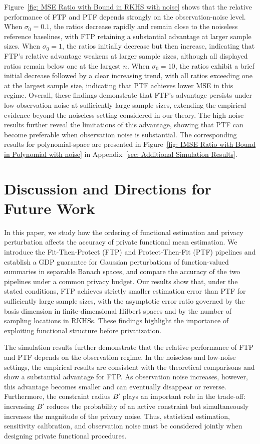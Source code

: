 \documentclass[twoside,11pt]{article}
\begin{document}
Figure~\ref{fig: MSE Ratio with Bound in RKHS with noise} shows that the relative performance of FTP and PTF depends strongly on the observation-noise level. When $\sigma_0=0.1$, the ratios decrease rapidly and remain close to the noiseless reference baselines, with FTP retaining a substantial advantage at larger sample sizes. When $\sigma_0=1$, the ratios initially decrease but then increase, indicating that FTP's relative advantage weakens at larger sample sizes, although all displayed ratios remain below one at the largest $n$. When $\sigma_0=10$, the ratios exhibit a brief initial decrease followed by a clear increasing trend, with all ratios exceeding one at the largest sample size, indicating that PTF achieves lower MSE in this regime. Overall, these findings demonstrate that FTP's advantage persists under low observation noise at sufficiently large sample sizes, extending the empirical evidence beyond the noiseless setting considered in our theory. The high-noise results further reveal the limitations of this advantage, showing that PTF can become preferable when observation noise is substantial. The corresponding results for polynomial-space are presented in Figure~\ref{fig: IMSE Ratio with Bound in Polynomial with noise} in Appendix~\ref{sec: Additional Simulation Results}.

\section{Discussion and Directions for Future Work}
\label{sec: Discussion}
In this paper, we study how the ordering of functional estimation and privacy perturbation affects the accuracy of private functional mean estimation. We introduce the Fit-Then-Protect (FTP) and Protect-Then-Fit (PTF) pipelines and establish a GDP guarantee for Gaussian perturbations of function-valued summaries in separable Banach spaces, and compare the accuracy of the two pipelines under a common privacy budget. Our results show that, under the stated conditions, FTP achieves strictly smaller estimation error than PTF for sufficiently large sample sizes, with the asymptotic error ratio governed by the basis dimension in finite-dimensional Hilbert spaces and by the number of sampling locations in RKHSs. These findings highlight the importance of exploiting functional structure before privatization.

The simulation results further demonstrate that the relative performance of FTP and PTF depends on the observation regime. In the noiseless and low-noise settings, the empirical results are consistent with the theoretical comparisons and show a substantial advantage for FTP. As observation noise increases, however, this advantage becomes smaller and can eventually disappear or reverse. Furthermore, the constraint radius $B'$ plays an important role in the trade-off: increasing $B'$ reduces the probability of an active constraint but simultaneously increases the magnitude of the privacy noise. Thus, statistical estimation, sensitivity calibration, and observation noise must be considered jointly when designing private functional procedures.
\end{document}
